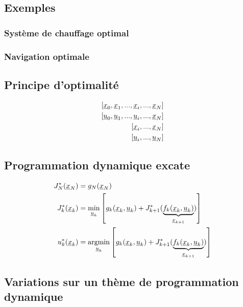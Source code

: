 \subsection{Exemples}

\subsubsection{Système de chauffage optimal}

\subsubsection{Navigation optimale}


\subsection{Principe d'optimalité}

\begin{align}
\left[ \underline{x}_0 , \underline{x}_1 , ... , \underline{x}_i , ... , \underline{x}_N \right] \\
\left[ \underline{u}_0 , \underline{u}_1 , ... , \underline{u}_i , ... , \underline{x}_N \right] \\
\left[  \underline{x}_i , ... , \underline{x}_N \right] \\
\left[  \underline{u}_i , ... , \underline{u}_N \right]
\end{align}

\subsection{Programmation dynamique excate}

\begin{align}
J^*_N(\col{x}_N) &= g_N(\col{x}_N) \\
J^*_k(\col{x}_k) &= 
\operatornamewithlimits{min}\limits_{\col{u}_k}
\left[
g_k(\col{x}_k , \col{u}_k ) + J^*_{k+1}( 
\underbrace{
f_k(\col{x}_k , \col{u}_k ) 
}_{\col{x}_{k+1}}
)
\right] \\
u^*_k(\col{x}_k) &= 
\operatornamewithlimits{argmin}\limits_{\col{u}_k}
\left[
g_k(\col{x}_k , \col{u}_k ) + J^*_{k+1}( 
\underbrace{
f_k(\col{x}_k , \col{u}_k ) 
}_{\col{x}_{k+1}}
)
\right] 
\label{eq:exactdp}
\end{align} 


\subsection{Variations sur un thème de programmation dynamique}

